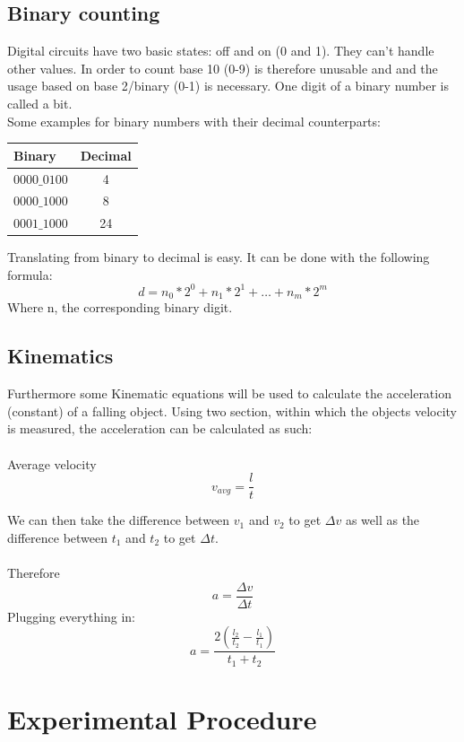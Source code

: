 \documentclass[fleqn,14pt]{article}
\begin{document}
\subsection{Binary counting}
Digital circuits have two basic states: off and on (0 and 1). They can’t handle other values.
In order to count base 10 (0-9) is therefore unusable and and the usage based on base 2/binary (0-1) is
necessary.
One digit of a binary number is called a bit.\\
Some examples for binary numbers with
their decimal counterparts:

\vspace{0.5cm}
\begin{tabular}{lc}
  Binary & Decimal\\
  \midrule
  $0000\_0100$ & 4\\
  $0000\_1000$ & 8\\
  $0001\_1000$ & 24\\
\end{tabular}
\vspace{0.5cm}


Translating from binary to decimal is easy. It can be done with the following formula:
$$
d=n_0\ast2^0+n_1\ast2^1+\ldots+n_m\ast2^m
$$
Where n, the corresponding binary digit.

\subsection{Kinematics}

Furthermore some Kinematic equations will be used to calculate the acceleration
(constant) of a falling object. Using two section, within which the objects velocity is measured,
the acceleration can be calculated as such:\\
\\
Average velocity
$$
v_{avg}=\frac{l}{t}
$$

We can then take the difference between $v_1$ and $v_2$ to get $\Delta v$ as well as the difference between
$t_1$ and $t_2$ to get $\Delta t$.\\
\\
Therefore
$$
a = \frac{\Delta v}{\Delta t}
$$
Plugging everything in:
$$
a = \frac{2(\frac{l_2}{t_2}-\frac{l_1}{t_1})}{t_1+t_2}
$$

\section{Experimental Procedure}
\end{document}

